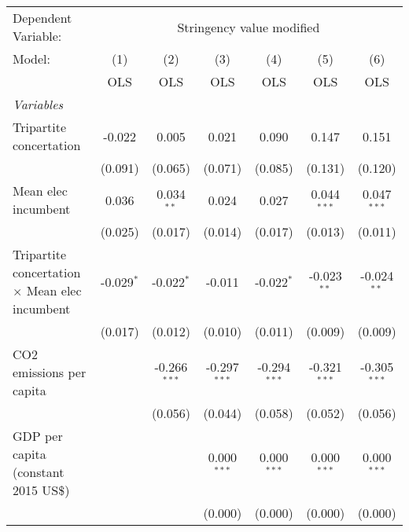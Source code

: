 
\begingroup
\centering
\begin{tabular}{lcccccc}
   \toprule
   Dependent Variable: & \multicolumn{6}{c}{Stringency value modified}\\
   Model:                                                & (1)          & (2)            & (3)            & (4)            & (5)            & (6)\\  
                                                         &  OLS         & OLS            & OLS            & OLS            & OLS            & OLS\\  
   \midrule
   \emph{Variables}\\
   Tripartite concertation                               & -0.022       & 0.005          & 0.021          & 0.090          & 0.147          & 0.151\\   
                                                         & (0.091)      & (0.065)        & (0.071)        & (0.085)        & (0.131)        & (0.120)\\   
   Mean elec incumbent                                   & 0.036        & 0.034$^{**}$   & 0.024          & 0.027          & 0.044$^{***}$  & 0.047$^{***}$\\   
                                                         & (0.025)      & (0.017)        & (0.014)        & (0.017)        & (0.013)        & (0.011)\\   
   Tripartite concertation $\times$ Mean elec incumbent  & -0.029$^{*}$ & -0.022$^{*}$   & -0.011         & -0.022$^{*}$   & -0.023$^{**}$  & -0.024$^{**}$\\   
                                                         & (0.017)      & (0.012)        & (0.010)        & (0.011)        & (0.009)        & (0.009)\\   
   CO2 emissions per capita                              &              & -0.266$^{***}$ & -0.297$^{***}$ & -0.294$^{***}$ & -0.321$^{***}$ & -0.305$^{***}$\\   
                                                         &              & (0.056)        & (0.044)        & (0.058)        & (0.052)        & (0.056)\\   
   GDP per capita (constant 2015 US\$)                   &              &                & 0.000$^{***}$  & 0.000$^{***}$  & 0.000$^{***}$  & 0.000$^{***}$\\   
                                                         &              &                & (0.000)        & (0.000)        & (0.000)        & (0.000)\\   

\end{tabular}
